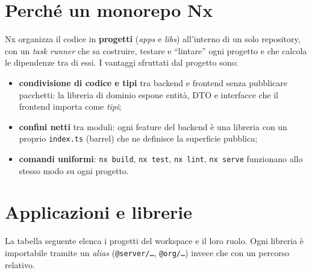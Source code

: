 \documentclass[11pt,a4paper,oneside]{report}
\newcommand{\code}[1]{\texttt{\small #1}}
\begin{document}
\section{Perché un monorepo Nx}
Nx organizza il codice in \textbf{progetti} (\emph{apps} e \emph{libs}) all'interno
di un solo repository, con un \emph{task runner} che sa costruire, testare e
``lintare'' ogni progetto e che calcola le dipendenze tra di essi. I vantaggi
sfruttati dal progetto sono:

\begin{itemize}[leftmargin=1.4em]
  \item \textbf{condivisione di codice e tipi} tra backend e frontend senza
        pubblicare pacchetti: la libreria di dominio espone entità, DTO e
        interfacce che il frontend importa come \emph{tipi};
  \item \textbf{confini netti} tra moduli: ogni feature del backend è una
        libreria con un proprio \code{index.ts} (barrel) che ne definisce la
        superficie pubblica;
  \item \textbf{comandi uniformi}: \code{nx build}, \code{nx test},
        \code{nx lint}, \code{nx serve} funzionano allo stesso modo su ogni
        progetto.
\end{itemize}

\section{Applicazioni e librerie}
La tabella seguente elenca i progetti del workspace e il loro ruolo. Ogni
libreria è importabile tramite un \emph{alias} (\code{@server/\ldots},
\code{@org/\ldots}) invece che con un percorso relativo.
\end{document}

